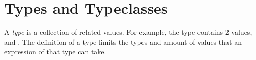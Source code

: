\section{Types and Typeclasses}\label{sec:Types_Typeclasses}
\begin{definition}[Type]\label{def:Type}
  A \emph{type} is a collection of related values.
  For example, the  type contains 2 values,  and .
  The definition of a type limits the types and amount of values that an expression of that type can take.
\end{definition}


